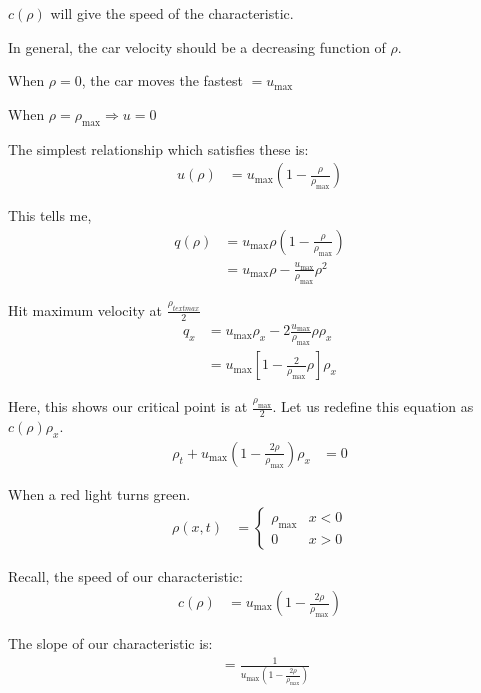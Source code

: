   $c(\rho)$ will give the speed of the characteristic.

  In general, the car velocity should be a decreasing function of $\rho$.

  When $\rho = 0$, the car moves the fastest $= u_{\text{max}}$

  When $\rho = \rho_{\text{max}} \Rightarrow u = 0$

  The simplest relationship which satisfies these is:
  \begin{align}
    u(\rho) & = u_{\text{max}}\left(1 - \frac{\rho}{\rho_{\text{max}}}\right)
  \end{align}

  This tells me,
  \begin{align}
    q(\rho)
    & = u_{\text{max}} \rho\left( 1 - \frac{\rho}{\rho_{\text{max}}}\right)\\
    & = u_{\text{max}} \rho - \frac{u_{\text{max}}}{\rho_{\text{max}}} \rho^2
  \end{align}

  Hit maximum velocity at $\frac{\rho_{text{max}}}{2}$
  \begin{align}
    q_x
    & = u_{\text{max}} \rho_x - 2 \frac{u_{\max}}{\rho_{\max}} \rho \rho_x\\
    & = u_{\max} \left[ 1 - \frac{2}{\rho_{\max}} \rho \right] \rho_x
  \end{align}

  Here, this shows our critical point is at $\frac{\rho_{\max}}{2}$. Let us
  redefine this equation as $c(\rho) \rho_x$.
  \begin{align}
    \rho_t + u_{\max} \left( 1 - \frac{2\rho}{\rho_{\max}}\right) \rho_x & = 0
  \end{align}

  \ex When a red light turns green.
  \begin{align}
    \rho(x, t) & =
    \begin{cases}
      \rho_{\max} & x < 0\\
      0 & x > 0
    \end{cases}
  \end{align}

  Recall, the speed of our characteristic:
  \begin{align}
    c(\rho) & = u_{\max} \left(1 - \frac{2 \rho}{\rho_{\max}}\right)
  \end{align}

  The slope of our characteristic is:
  \begin{align}
    & = \frac{1}{u_{\max} \left(1 - \frac{2 \rho}{\rho_{\max}}\right)}
  \end{align}

